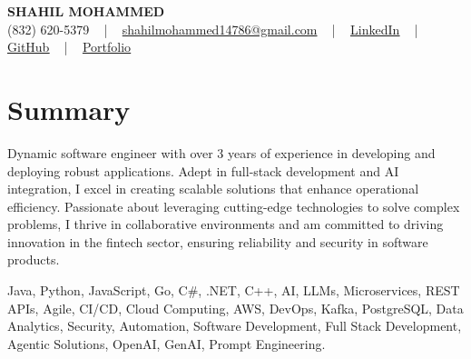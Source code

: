 \documentclass[letterpaper,10pt]{article}
\begin{document}
\begin{center}
    {\fontsize{14pt}{12pt}\selectfont \textbf{\MakeUppercase{Shahil Mohammed}}}\\ \vspace{2pt}
    \fontsize{10pt}{12pt}\selectfont (832) 620-5379 ~ | ~ \href{mailto:shahilmohammed14786@gmail.com}{shahilmohammed14786@gmail.com} ~ | ~  
    \href{https://www.linkedin.com/in/shahil-mohammed-9652931a1/}{\color{blue}\underline{LinkedIn}}  ~ | ~ 
    \href{https://github.com/freakbeast14}{\color{blue}\underline{GitHub}} ~ | ~ 
    \href{https://shahil-mohammed.netlify.app/}{\color{blue}\underline{Portfolio}}
    \vspace{-8pt}
\end{center}

\section{Summary}
\vspace{-2pt}\fontsize{8pt}{9pt}\selectfont
Dynamic software engineer with over 3 years of experience in developing and deploying robust applications. Adept in full-stack development and AI integration, I excel in creating scalable solutions that enhance operational efficiency. Passionate about leveraging cutting-edge technologies to solve complex problems, I thrive in collaborative environments and am committed to driving innovation in the fintech sector, ensuring reliability and security in software products.
 \vspace{-5pt}
 
{\fontsize{1pt}{1pt}\selectfont\color{white}
Java, Python, JavaScript, Go, C#, .NET, C++, AI, LLMs, Microservices, REST APIs, Agile, CI/CD, Cloud Computing, AWS, DevOps, Kafka, PostgreSQL, Data Analytics, Security, Automation, Software Development, Full Stack Development, Agentic Solutions, OpenAI, GenAI, Prompt Engineering.
}
\vspace{-8pt}

\vspace{-2pt}
\end{document}
